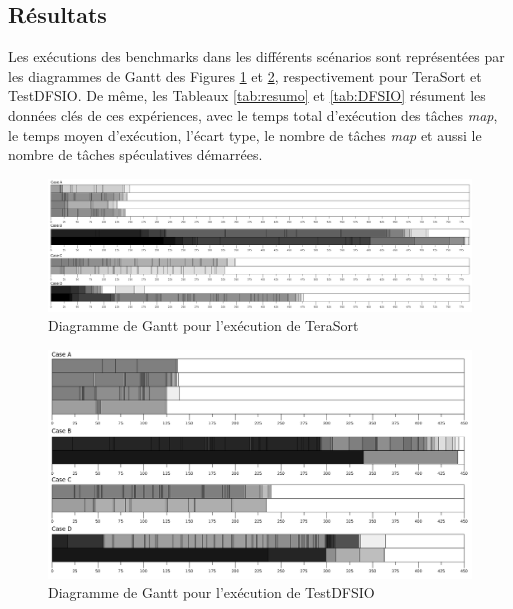 \subsection{Résultats\label{sec:5.4}} 

Les exécutions des benchmarks dans les différents scénarios sont représentées par les diagrammes de Gantt des Figures \ref{fig:gantts} et \ref{fig:DFSIO}, respectivement pour TeraSort et TestDFSIO. De même, les Tableaux \ref{tab:resumo} et \ref{tab:DFSIO} résument les données clés de ces expériences, avec le temps total d'exécution des tâches \textit{map}, le temps moyen d'exécution, l'écart type, le nombre de tâches \textit{map} et aussi le nombre de tâches spéculatives démarrées.  

\begin{figure}[!ht]
	\centering
	\includegraphics[width=1\textwidth]{img/todos}
	\caption{Diagramme de Gantt pour l'exécution de TeraSort}
	\label{fig:gantts}
\end{figure}

\begin{figure}[!ht]
	\centering
	\includegraphics[width=1\textwidth]{img/todos-DFSIO}
	\caption{Diagramme de Gantt pour l'exécution de TestDFSIO}
	\label{fig:DFSIO}
\end{figure}


